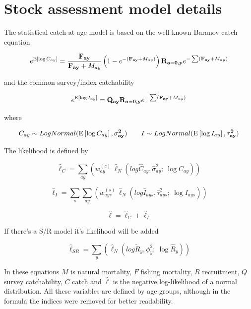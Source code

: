 \documentclass[a4paper,english,10pt]{article}\usepackage[]{graphicx}\usepackage[]{color}
\begin{document}
\section{Stock assessment model details}

The statistical catch at age model is based on the well known Baranov catch equation

\begin{equation*}
e^{\text{E}\left[\log C_{ay}\right]} = \frac{\mathbf{F_{ay}}}{\mathbf{F_{ay}}+M_{ay}}\left(1 - e^{-(\mathbf{F_{ay}}+M_{ay})}\right) \mathbf{R_{a=0,y}}e^{-\sum (\mathbf{F_{ay}} + M_{ay})}
\end{equation*}

and the common survey/index catchability 

\begin{equation*}
e^{\text{E}\left[\log I_{ay}\right]} = \mathbf{Q_{ay}} \mathbf{R_{a=0,y}}e^{-\sum (\mathbf{F_{ay}} + M_{ay})}
\end{equation*}

where 

\begin{equation*}
C_{ay} \sim LogNormal(\text{E}\left[\log C_{ay}\right], \mathbf{\sigma^2_{ay}}) \qquad I \sim LogNormal(\text{E}\left[\log I_{ay}\right], \mathbf{\tau^2_{ay}})
\end{equation*}

The likelihood is defined by 

\begin{equation*}
\hat{\ell}_C = \sum_{ay}(w^{(c)}_{ay}\ \hat{\ell}_N(log \hat{C}_{ay}, \hat{\sigma}^2_{ay};\ \log C_{ay})) 
\end{equation*}

\begin{equation*}
\hat{\ell}_I = \sum_s \sum_{ay}(w^{(s)}_{ays}\ \hat{\ell}_N(log \hat{I}_{ays}, \hat{\tau}_{ays}^2;\ \log I_{ays}))
\end{equation*}

\begin{equation*}
\hat{\ell} = \hat{\ell}_C + \hat{\ell}_I
\end{equation*}

If there's a S/R model it's likelihood will be added

\begin{equation*}
\hat{\ell}_{SR} = \sum_y( \hat{\ell}_N(log \tilde{R}_y, \phi_y^2;\ \log \hat{R}_y))
\end{equation*}

In these equations $M$ is natural mortality, $F$ fishing mortality, $R$ recruitment, $Q$ survey catchability, $C$ catch and $\hat{\ell}$ is the negative log-likelihood of a normal distribution. All these variables are defined by age groups, although in the formula the indices were removed for better readability.
 
\end{document}
